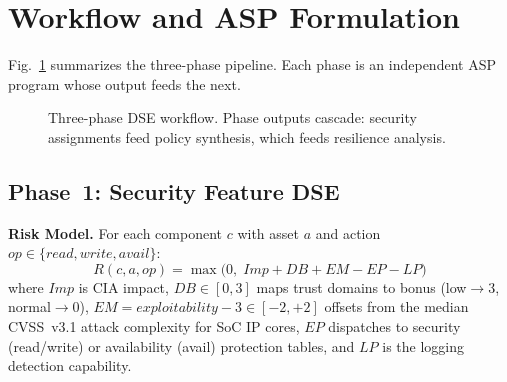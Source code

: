 \documentclass[conference]{IEEEtran}
\begin{document}
\section{Workflow and ASP Formulation}

Fig.~\ref{fig:workflow} summarizes the three-phase pipeline.
Each phase is an independent ASP program whose output feeds the next.

\begin{figure}[t]
\centering
{}
\caption{Three-phase DSE workflow. Phase outputs cascade: security
  assignments feed policy synthesis, which feeds resilience analysis.}
\label{fig:workflow}
\end{figure}

\subsection{Phase~1: Security Feature DSE}

\textbf{Risk Model.} For each component $c$ with asset $a$ and action
$\mathit{op} \in \{\mathit{read},\mathit{write},\mathit{avail}\}$:
\begin{equation}
R(c,a,\mathit{op}) = \max\!\bigl(0,\;\mathit{Imp}+\mathit{DB}+\mathit{EM}
  -\mathit{EP}-\mathit{LP}\bigr)
\label{eq:risk}
\end{equation}
where $\mathit{Imp}$ is CIA impact, $\mathit{DB} \in [0,3]$ maps trust
domains to bonus (low$\to$3, normal$\to$0), $\mathit{EM} =
\mathit{exploitability} - 3 \in [-2,+2]$ offsets from the median CVSS~v3.1
attack complexity for SoC IP cores, $\mathit{EP}$ dispatches to security
(read/write) or availability (avail) protection tables, and $\mathit{LP}$
is the logging detection capability.
\end{document}
